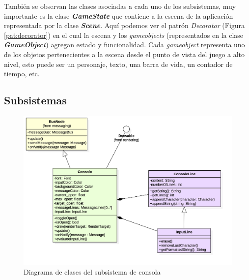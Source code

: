 \bigskip

También se observan las clases asociadas a cada uno de los subsistemas, muy importante es la clase \textbf{\textit{GameState}} que contiene a la escena de la aplicación representada por la clase \textbf{\textit{Scene}}. Aquí podemos ver el patrón \textit{Decorator} (Figura \ref{pat:decorator}) en el cual la escena y los \textit{gameobjects} (representados en la clase \textbf{\textit{GameObject}}) agregan estado y funcionalidad. Cada \textit{gameobject} representa uno de los objetos pertenecientes a la escena desde el punto de vista del juego a alto nivel, esto puede ser un personaje, texto, una barra de vida, un contador de tiempo, etc.


\subsection{Subsistemas}



\begin{figure}
	\centerline{\includegraphics[width=15cm]{otros/UML/png/alld/png/console__diagramaDeClases_console_3.png}}
	\caption{Diagrama de clases del subsistema de consola}
	\label{class:console}
\end{figure}

